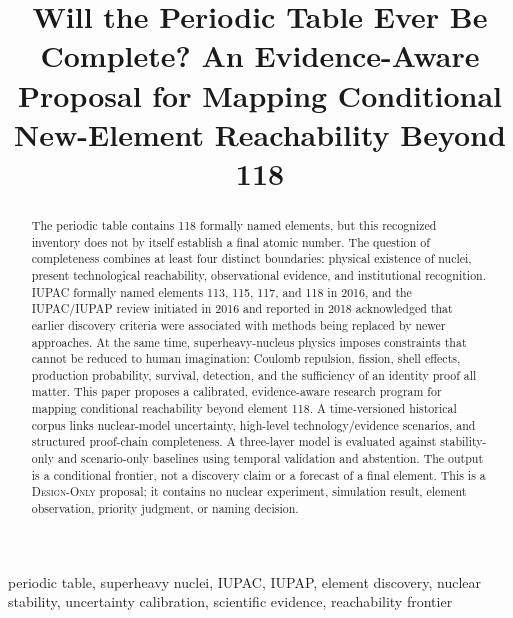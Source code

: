 \documentclass[conference]{IEEEtran}
\newcommand{\designonly}{\textsc{Design-Only}}
\begin{document}
\raggedbottom

\title{Will the Periodic Table Ever Be Complete? An Evidence-Aware Proposal for Mapping Conditional New-Element Reachability Beyond 118}

\author{
}

\maketitle

\begin{abstract}
The periodic table contains 118 formally named elements, but this recognized inventory does not by itself establish a final atomic number. The question of completeness combines at least four distinct boundaries: physical existence of nuclei, present technological reachability, observational evidence, and institutional recognition. IUPAC formally named elements 113, 115, 117, and 118 in 2016, and the IUPAC/IUPAP review initiated in 2016 and reported in 2018 acknowledged that earlier discovery criteria were associated with methods being replaced by newer approaches. At the same time, superheavy-nucleus physics imposes constraints that cannot be reduced to human imagination: Coulomb repulsion, fission, shell effects, production probability, survival, detection, and the sufficiency of an identity proof all matter. This paper proposes a calibrated, evidence-aware research program for mapping conditional reachability beyond element 118. A time-versioned historical corpus links nuclear-model uncertainty, high-level technology/evidence scenarios, and structured proof-chain completeness. A three-layer model is evaluated against stability-only and scenario-only baselines using temporal validation and abstention. The output is a conditional frontier, not a discovery claim or a forecast of a final element. This is a \designonly{} proposal; it contains no nuclear experiment, simulation result, element observation, priority judgment, or naming decision.
\end{abstract}

\begin{IEEEkeywords}
periodic table, superheavy nuclei, IUPAC, IUPAP, element discovery, nuclear stability, uncertainty calibration, scientific evidence, reachability frontier
\end{IEEEkeywords}
\end{document}
